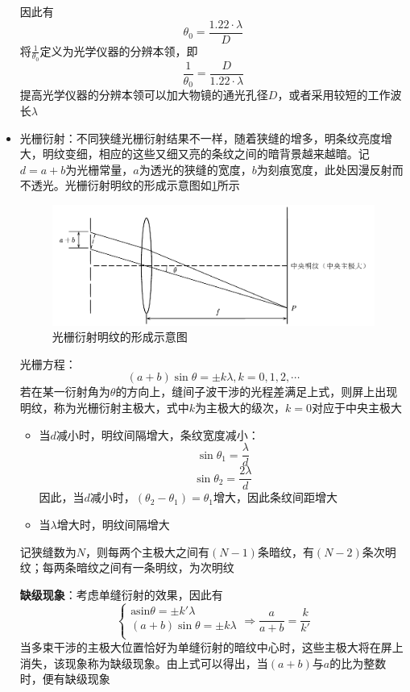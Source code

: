 \documentclass[12pt, a4paper, twoside]{ctexbook}
\begin{document}
\begin{itemize}
    因此有
    $$
    \theta_0=\frac{1.22\cdot\lambda}{D}
    $$
    将$\frac{1}{\theta_0}$定义为光学仪器的分辨本领，即
    $$
    \frac{1}{\theta_0}=\frac{D}{1.22\cdot\lambda}
    $$
    提高光学仪器的分辨本领可以加大物镜的通光孔径$D$，或者采用较短的工作波长$\lambda$
    \item {\sonti 光栅衍射}：不同狭缝光栅衍射结果不一样，随着狭缝的增多，明条纹亮度增大，明纹变细，相应的这些又细又亮的条纹之间的暗背景越来越暗。记$d=a+b$为光栅常量，$a$为透光的狭缝的宽度，$b$为刻痕宽度，此处因漫反射而不透光。光栅衍射明纹的形成示意图如\textcolor{blue}{\cref{fig:光栅衍射}}所示
    \begin{figure}[H]
        \centerline{\includegraphics[scale=0.90]{光栅衍射.pdf}}
        \caption{光栅衍射明纹的形成示意图}\label{fig:光栅衍射}
    \end{figure}
    光栅方程：
    $$
    \left(a+b\right)\sin\theta=\pm k\lambda,k=0,1,2,\cdots
    $$
    若在某一衍射角为$\theta$的方向上，缝间子波干涉的光程差满足上式，则屏上出现明纹，称为光栅衍射主极大，式中$k$为主极大的级次，$k=0$对应于中央主极大
    \begin{itemize}
        \item 当$d$减小时，明纹间隔增大，条纹宽度减小：
        $$
        \sin\theta_1=\frac{\lambda}{d}
        $$
        $$
        \sin\theta_2=\frac{2\lambda}{d}
        $$
        因此，当$d$减小时，$\left(\theta_2-\theta_1\right)=\theta_1$增大，因此条纹间距增大
        \item 当$\lambda$增大时，明纹间隔增大
    \end{itemize}
    记狭缝数为$N$，则每两个主极大之间有$\left(N-1\right)$条暗纹，有$\left(N-2\right)$条次明纹；每两条暗纹之间有一条明纹，为次明纹
    
    \textbf{缺级现象}：考虑单缝衍射的效果，因此有
    $$
    \left\{ \begin{array}{l}
        \text{asin}\theta =\pm k'\lambda\\
        \left( a+b \right) \sin \theta =\pm k\lambda\\
    \end{array}\Rightarrow \frac{a}{a+b}=\frac{k}{k'} \right. 
    $$
    当多束干涉的主极大位置恰好为单缝衍射的暗纹中心时，这些主极大将在屏上消失，该现象称为缺级现象。由上式可以得出，当$\left(a+b\right)$与$a$的比为整数时，便有缺级现象
\end{itemize}
\end{document}
